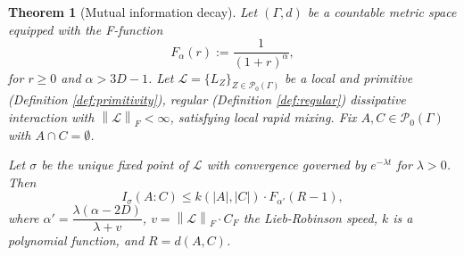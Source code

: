 \documentclass[11pt]{article}
\numberwithin{equation}{section}
\numberwithin{figure}{section}
\numberwithin{table}{section}
\theoremstyle{definition}
\theoremstyle{plain}
\newtheorem{thm}{Theorem}[section]
\theoremstyle{remark}
\newcommand{\Li}{\mathcal{L}}
\newcommand{\norm}[1]{\left\lVert#1\right\rVert}
\newcommand{\normm}[2]{\left\lVert#1\right\rVert_{#2}}
\newcommand{\abs}[1]{\left \vert#1\right\vert}
\begin{document}
\begin{thm}[Mutual information decay]\label{thm:MutualInfoDecay}
    Let $(\Gamma,d)$ be a countable metric space equipped with the F-function\[F_\alpha(r):=\dfrac{1}{(1+r)^\alpha},\]for $r\geq 0$ and $\alpha>3D-1$. Let $\Li=\{L_Z\}_{Z\in \mathcal{P}_0(\Gamma)}$ be a local and primitive (Definition \ref{def:primitivity}), regular (Definition \ref{def:regular}) dissipative interaction with $\normm{\Li}{F}<\infty$, satisfying local rapid mixing. Fix $A,C\in \mathcal{P}_0(\Gamma)$ with $A\cap C=\emptyset$. 

    Let $\sigma$ be the unique fixed point of $\Li$ with convergence governed by $e^{-\lambda t}$ for $\lambda >0$. Then
    \begin{equation}
        I_\sigma(A:C)\leq k(\abs{A},\abs{C}) \cdot F_{\alpha '}(R-1),
    \end{equation}
     where $\alpha'=\dfrac{\lambda(\alpha-2D)}{\lambda +v}$, $v=\normm{\Li}{F}\cdot  C_F$ the Lieb-Robinson speed, $k$ is a polynomial function, and $R=d(A,C)$.
\end{thm}
\end{document}
